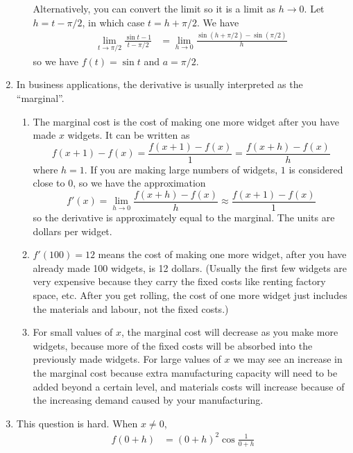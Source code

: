 \documentclass{article}
\begin{document}
\begin{enumerate}
\begin{enumerate}
    Alternatively, you can convert the limit so it is a limit as
    $h\to 0$.  Let $h=t-\pi/2$, in which case $t=h + \pi/2$.  We have
    \begin{align*}
      \lim_{t\to\pi/2} \frac{\sin t - 1}{t-\pi/2}
      &= \lim_{h\to 0} \frac{\sin(h+\pi/2)-\sin(\pi/2)}{h}
    \end{align*}
    so we have $f(t)=\sin t$ and $a=\pi/2$.
  \end{enumerate}
\item %
  In business applications, the derivative is usually interpreted
  as the ``marginal''.
  \begin{enumerate}
  \item The marginal cost is the cost of making one more widget after
    you have made $x$ widgets.  It can be written as
    \begin{equation*}
      f(x+1) - f(x) = \frac{f(x+1)-f(x)}{1} = \frac{f(x+h)-f(x)}{h}
    \end{equation*}
    where $h=1$.  If you are making large numbers of widgets, $1$ is
    considered close to $0$, so we have the approximation
    \begin{equation*}
      f'(x) = \lim_{h\to 0} \frac{f(x+h)-f(x)}{h} \approx
      \frac{f(x+1)-f(x)}{1}
    \end{equation*}
    so the derivative is approximately equal to the marginal.  The
    units are dollars per widget.
  \item $f'(100)=12$ means the cost of making one more widget, after
    you have already made 100 widgets, is 12 dollars.  (Usually the
    first few widgets are very expensive because they carry the fixed
    costs like renting factory space, etc.  After you get rolling, the
    cost of one more widget just includes the materials and labour,
    not the fixed costs.)
  \item For small values of $x$, the marginal cost will decrease as
    you make more widgets, because more of the fixed costs will be
    absorbed into the previously made widgets.  For large values of
    $x$ we may see an increase in the marginal cost because extra
    manufacturing capacity will need to be added beyond a certain
    level, and materials costs will increase because of the increasing
    demand caused by your manufacturing.
  \end{enumerate}
\item %
  This question is hard.  When $x\ne 0$,
  \begin{align*}
    f(0+h) &= (0+h)^2 \cos \frac{1}{0+h}
    \\

\end{align*}
\end{enumerate}
\end{document}
